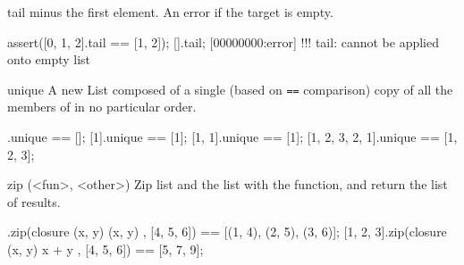 \begin{urbiscriptapi}
\item[tail]%
  \this minus the first element. An error if the target is empty.
\begin{urbiscript}
assert([0, 1, 2].tail == [1, 2]);
[].tail;
[00000000:error] !!! tail: cannot be applied onto empty list
\end{urbiscript}


\item[unique]%
  A new List composed of a single (based on \lstinline|==| comparison) copy
  of all the members of \this in no particular order.
\begin{urbiassert}
             [].unique == [];
            [1].unique == [1];
         [1, 1].unique == [1];
[1, 2, 3, 2, 1].unique == [1, 2, 3];
\end{urbiassert}


\item[zip](<fun>, <other>)%
  Zip \this list and the  list with the  function, and
  return the list of results.

\begin{urbiassert}
[1, 2, 3].zip(closure (x, y) { (x, y) }, [4, 5, 6])
       == [(1, 4), (2, 5), (3, 6)];
[1, 2, 3].zip(closure (x, y) { x + y }, [4, 5, 6])
       == [5, 7, 9];
\end{urbiassert}
\end{urbiscriptapi}


